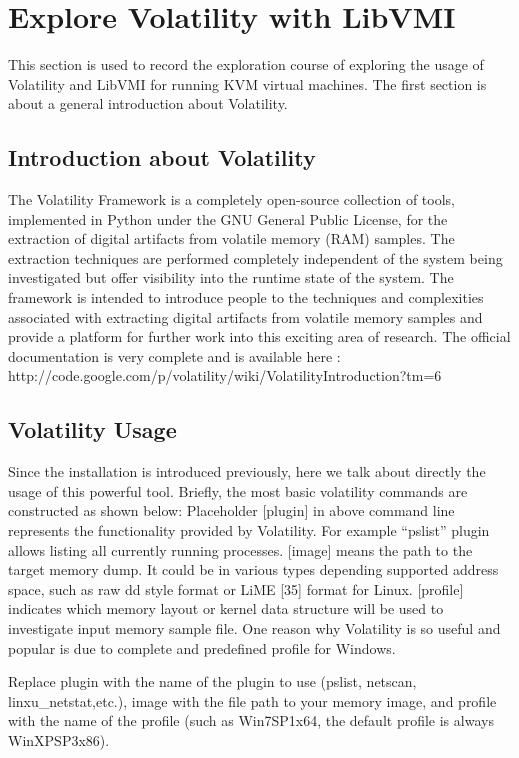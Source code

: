 \section{Explore Volatility with LibVMI}
This section is used to record the exploration course of exploring the usage of Volatility and LibVMI for running KVM virtual machines. 
The first section is about a general introduction about Volatility.
\subsection{Introduction about Volatility}
The Volatility Framework is a completely open-source collection of tools, implemented in Python under the GNU General Public License, 
for the extraction of digital artifacts from volatile memory (RAM) samples. The extraction techniques are performed completely independent 
of the system being investigated but offer visibility into the runtime state of the system. The framework is intended to introduce people 
to the techniques and complexities associated with extracting digital artifacts from volatile memory samples and provide a platform for 
further work into this exciting area of research. The official documentation is very complete and is available here
: http://code.google.com/p/volatility/wiki/VolatilityIntroduction?tm=6
\subsection{Volatility Usage}
Since the installation is introduced previously, here we talk about directly the usage of this powerful tool. Briefly, the most basic 
volatility commands are constructed as shown below:
Placeholder [plugin] in above command line represents the functionality provided by Volatility. For example “pslist” plugin allows listing all 
currently running processes. [image] means the path to the target memory dump. It could be in various types depending supported address 
space, such as raw dd style format or LiME [35] format for Linux. [profile] indicates which memory layout or kernel data structure will 
be used to investigate input memory sample file. One reason why Volatility is so useful and popular is due to complete and predefined 
profile for Windows.

Replace plugin with the name of the plugin to use (pslist, netscan, linxu\_netstat,etc.), image with the file path to your memory image, 
and profile with the name of the profile (such as Win7SP1x64, the default profile is always WinXPSP3x86).

